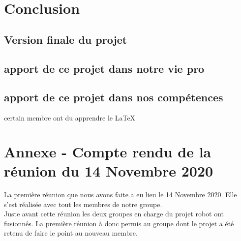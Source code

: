 \documentclass{PackagerQualityN}
\begin{document}
\newp
\section{Conclusion}

\subsection{Version finale du projet}

\subsection{apport de ce projet dans notre vie pro}


\subsection{apport de ce projet dans nos compétences}
certain membre ont du apprendre le \LaTeX

\newp  

\appendix
\section*{Annexe - Compte rendu de la réunion du 14 Novembre 2020}
La première réunion que nous avons faite a eu lieu le 14 Novembre 2020. Elle s'est réalisée avec tout les membres de notre groupe.
\\

Juste avant cette réunion les deux groupes en charge du projet robot ont fusionnés. La première réunion à donc permis au groupe dont le projet a été retenu de faire le point au nouveau membre. 
\\
\end{document}
